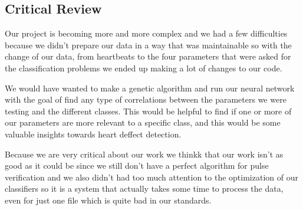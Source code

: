 \documentclass[conference]{IEEEtran}
\begin{document}
\begin{itemize}
\begin{itemize}
\section{Critical Review}
Our project is becoming more and more complex and we had a few difficulties
because we didn't prepare our data in a way that was maintainable so with the
change of our data, from heartbeats to the four parameters that were asked for
the classification problems we ended up making a lot of changes to our code.

We would have wanted to make a genetic algorithm and run our neural network with
the goal of find any type of correlations between the parameters we were testing
and the different classes. This would be helpful to find if one or more of our
parameters are more relevant to a specific class, and this would be some
valuable insights towards heart deffect detection.

Because we are very critical about our work we thinkk that our work isn't as
good as it could be since we still don't have a perfect algorithm for pulse
verification and we also didn't had too much attention to the optimization of
our classifiers so it is a system that actually takes some time to process the
data, even for just one file which is quite bad in our standards.


\end{itemize}
\end{itemize}
\end{document}

